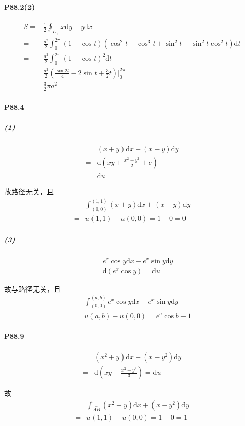 \documentclass[UTF8]{ctexart}
\begin{document}
\paragraph*{P88.2(2)}
\begin{align*}
    S =& \frac{1}{2} \oint_{L_+} x \mathrm{d}y -y \mathrm{d}x \\
    =& \frac{a^2}{2} \int_{0}^{2\pi} (1-\cos t) (\cos^2t-\cos^3t+\sin^2t-\sin^2t\cos^2 t) \mathrm{d}t\\
    =& \frac{a^2}{2} \int_{0}^{2\pi} (1-\cos t) ^ 2 \mathrm{d}t \\
    =& \frac{a^2}{2}\left(\frac{\sin 2t}{4} - 2 \sin t + \frac{3}{2} t \right) \big|_{0}^{2\pi}\\
    =& \frac{3}{2} \pi a^2
\end{align*}
\paragraph*{P88.4}
\subparagraph*{(1)}
\begin{align*}
    &(x+y)\mathrm{d}x+(x-y)\mathrm{d}y \\
    =& \mathrm{d}(xy + \frac{x^2-y^2}{2} + c) \\
    =& \mathrm{d}u
\end{align*}

故路径无关，且
\begin{align*}
    &\int_{(0,0)}^{(1,1)} (x+y)\mathrm{d}x+(x-y)\mathrm{d}y \\
    =& u(1,1) - u(0, 0) = 1 - 0 = 0
\end{align*}
\subparagraph*{(3)}
\begin{align*}
    &e^x\cos y \mathrm{d}x - e^x \sin y \mathrm{d}y \\
    =& \mathrm{d}(e^x \cos y) = \mathrm{d}u
\end{align*}

故与路径无关，且
\begin{align*}
    &\int_{(0,0)}^{(a,b)} e^x \cos y \mathrm{d}x - e^x \sin y \mathrm{d}y \\
    =& u(a,b) - u(0, 0) = e^a \cos b - 1
\end{align*}
\paragraph*{P88.9}
\begin{align*}
    & (x^2+y)\mathrm{d}x + (x - y^2) \mathrm{d}y \\
    =& \mathrm{d}\left(xy+\frac{x^3 -y ^3}{3} \right) = \mathrm{d}u
\end{align*}

故
\begin{align*}
    &\int_{\overset{\frown}{AB}}^{} (x^2+y)\mathrm{d}x + (x - y^2) \mathrm{d}y \\
    =& u(1,1) - u(0, 0) = 1 - 0 = 1
\end{align*}
\end{document}
